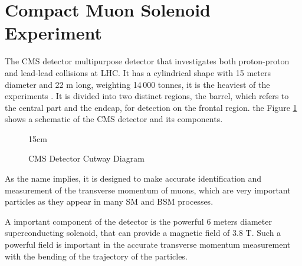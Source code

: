 \section{Compact Muon Solenoid Experiment}\label{sec:CMS}

The CMS detector multipurpose detector that investigates both proton-proton and lead-lead collisions at LHC. It has a cylindrical shape with 15 meters diameter and 22 m long, weighting 14\,000 tonnes, it is the heaviest of the experiments \cite{CMS:2008xjf}. It is divided into two distinct regions, the barrel, which refers to the central part and the endcap, for detection on the frontal region. the Figure \ref{fig:cms_diagram} shows a schematic of the CMS detector and its components.

\begin{figure}[!htm]{15cm} %
\caption{CMS Detector Cutway Diagram}%
\label{fig:cms_diagram}
\end{figure}

As the name implies, it is designed to make accurate identification and measurement of the transverse momentum of muons, which are very important particles as they appear in many SM and BSM processes.

A important component of the detector is the powerful 6 meters diameter superconducting solenoid, that can provide a magnetic field of 3.8 T. Such a powerful field is important in the accurate transverse momentum measurement with the bending of the trajectory of the particles.


